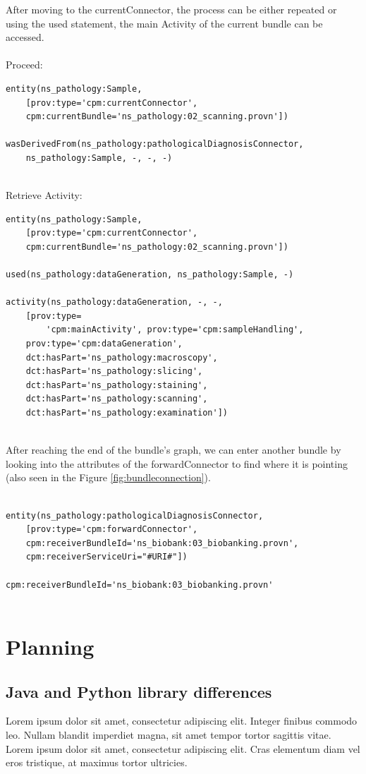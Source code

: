 \documentclass[
  digital,     %
  oneside,     %
  nosansbold,  %
  nocolorbold, %
  lof,         %
  lot,         %
]{fithesis4}
\begin{document}
After moving to the currentConnector, the process can be either repeated or using the used statement, the main Activity of the current bundle can be accessed.\\\\Proceed: 
\begin{verbatim}
entity(ns_pathology:Sample, 
    [prov:type='cpm:currentConnector',
    cpm:currentBundle='ns_pathology:02_scanning.provn'])

wasDerivedFrom(ns_pathology:pathologicalDiagnosisConnector, 
    ns_pathology:Sample, -, -, -)
    
\end{verbatim}
Retrieve Activity:
\begin{verbatim}
entity(ns_pathology:Sample, 
    [prov:type='cpm:currentConnector',
    cpm:currentBundle='ns_pathology:02_scanning.provn'])

used(ns_pathology:dataGeneration, ns_pathology:Sample, -)

activity(ns_pathology:dataGeneration, -, -, 
    [prov:type=
        'cpm:mainActivity', prov:type='cpm:sampleHandling',
    prov:type='cpm:dataGeneration', 
    dct:hasPart='ns_pathology:macroscopy', 
    dct:hasPart='ns_pathology:slicing',
    dct:hasPart='ns_pathology:staining', 
    dct:hasPart='ns_pathology:scanning',
    dct:hasPart='ns_pathology:examination'])
    
\end{verbatim}

After reaching the end of the bundle's graph, we can enter another bundle by looking into the attributes of the forwardConnector to find where it is pointing (also seen in the Figure \ref{fig:bundleconnection}).

\begin{verbatim}

entity(ns_pathology:pathologicalDiagnosisConnector, 
    [prov:type='cpm:forwardConnector',
    cpm:receiverBundleId='ns_biobank:03_biobanking.provn', 
    cpm:receiverServiceUri="#URI#"])

cpm:receiverBundleId='ns_biobank:03_biobanking.provn'
    
\end{verbatim}

\shorthandon{-}


\chapter{Planning}
\section{Java and Python library differences}
Lorem ipsum dolor sit amet, consectetur adipiscing elit. Integer finibus commodo leo. Nullam blandit imperdiet magna, sit amet tempor tortor sagittis vitae. Lorem ipsum dolor sit amet, consectetur adipiscing elit. Cras elementum diam vel eros tristique, at maximus tortor ultricies.
\end{document}
